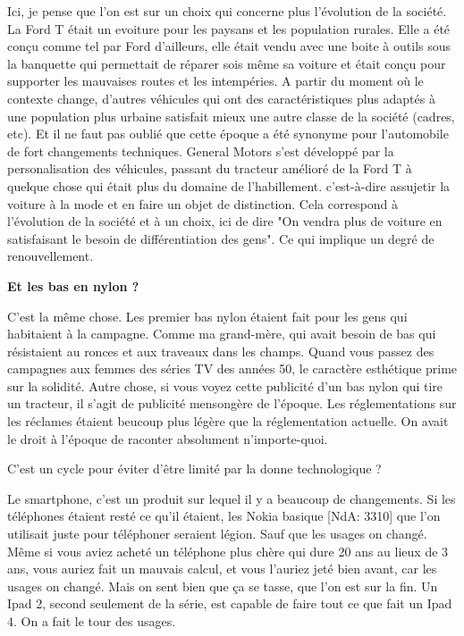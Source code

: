 \begin{small}
Ici, je pense que l'on est sur un choix qui concerne plus l'évolution de la société.
La Ford T était un evoiture pour les paysans et les population rurales. Elle a été conçu comme tel par Ford d'ailleurs, elle était vendu avec une boite à outils sous la banquette qui permettait de réparer sois même sa voiture et était conçu pour supporter les mauvaises routes et les intempéries.
A partir du moment où le contexte change, d'autres véhicules qui ont des caractéristiques plus adaptés à une population plus urbaine satisfait mieux une autre classe de la société (cadres, etc).
Et il ne faut pas oublié que cette époque a été synonyme pour l'automobile de fort changements techniques. General Motors s'est développé par la personalisation des véhicules, passant du tracteur amélioré de la Ford T à quelque chose qui était plus du domaine de l'habillement. c'est-à-dire assujetir la voiture à la mode et en faire un objet de distinction.
Cela correspond à l'évolution de la société et à un choix, ici de dire "On vendra plus de voiture en satisfaisant le besoin de différentiation des gens". Ce qui implique un degré de renouvellement.

\textbf{Et les bas en nylon ?}
\smallbreak


C'est la même chose. Les premier bas nylon étaient fait pour les gens qui habitaient à la campagne. Comme ma grand-mère, qui avait besoin de bas qui résistaient au ronces et aux traveaux dans les champs.
Quand vous passez des campagnes aux femmes des séries TV des années 50, le caractère esthétique prime sur la solidité. Autre chose, si vous voyez cette publicité d'un bas nylon qui tire un tracteur, il s'agit de publicité mensongère de l'époque. Les réglementations sur les réclames étaient beucoup plus légère que la réglementation actuelle. On avait le droit à l'époque de raconter absolument n'importe-quoi.

C'est un cycle pour éviter d'être limité par la donne technologique ?

Le smartphone, c'est un produit sur lequel il y a beaucoup de changements. Si les téléphones étaient resté ce qu'il étaient, les Nokia basique [NdA: 3310] que l'on utilisait juste pour téléphoner seraient légion. Sauf que les usages on changé. Même si vous aviez acheté un téléphone plus chère qui dure 20 ans au lieux de 3 ans, vous auriez fait un mauvais calcul, et vous l'auriez jeté bien avant, car les usages on changé. Mais on sent bien que ça se tasse, que l'on est sur la fin. Un Ipad 2, second seulement de la série, est capable de faire tout ce que fait un Ipad 4. On a fait le tour des usages.


\end{small}
